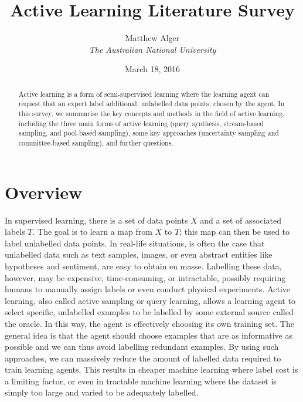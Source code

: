 \documentclass[a4paper]{article}
\begin{document}
    \title{Active Learning Literature Survey}
    \author{Matthew Alger \\ \emph{The Australian National University}}
    \date{March 18, 2016}
    \maketitle

    \begin{abstract}
        Active learning is a form of semi-supervised learning where the learning agent can request that an expert label additional, unlabelled data points, chosen by the agent. In this survey, we summarise the key concepts and methods in the field of active learning, including the three main forms of active learning (query synthesis, stream-based sampling, and pool-based sampling), some key approaches (uncertainty sampling and committee-based sampling), and further questions.
    \end{abstract}

    \section{Overview}
        In supervised learning, there is a set of data points $X$ and a set of associated labels $T$. The goal is to learn a map from $X$ to $T$; this map can then be used to label unlabelled data points. In real-life situations, is often the case that unlabelled data such as text samples\cite{lewis94,mccallum98}, images\cite{loy11,lintott08}, or even abstract entities like hypotheses\cite{king04} and sentiment\cite{kranjc15,smailovic14}, are easy to obtain en masse. Labelling these data, however, may be expensive, time-consuming, or intractable, possibly requiring humans to manually assign labels or even conduct physical experiments. Active learning, also called active sampling\cite{plutowski94} or query learning\cite{settles09,seung92}, allows a learning agent to select specific, unlabelled examples to be labelled by some external source called the oracle. In this way, the agent is effectively choosing its own training set\cite{settles09}. The general idea is that the agent should choose examples that are as informative as possible\cite{mccallum98} and we can thus avoid labelling redundant examples\cite{engelson99}. By using such approaches, we can massively reduce the amount of labelled data required to train learning agents\cite{lewis94,king04}. This results in cheaper machine learning where label cost is a limiting factor, or even in tractable machine learning where the dataset is simply too large and varied to be adequately labelled.
\end{document}
